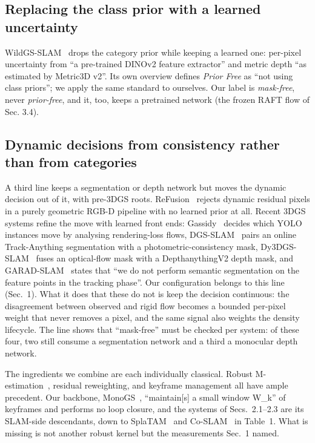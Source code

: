 \subsection{Replacing the class prior with a learned uncertainty}


WildGS-SLAM~\cite{wildgsslam} drops the category prior while keeping a learned one: per-pixel uncertainty from ``a pre-trained DINOv2 feature extractor'' and metric depth ``as estimated by Metric3D v2''. Its own overview defines \emph{Prior Free} as ``not using class priors''; we apply the same standard to ourselves. Our label is \emph{mask-free}, never \emph{prior-free}, and it, too, keeps a pretrained network (the frozen RAFT flow of Sec. 3.4).


\subsection{Dynamic decisions from consistency rather than from categories}


A third line keeps a segmentation or depth network but moves the dynamic decision out of it, with pre-3DGS roots. ReFusion~\cite{bonn} rejects dynamic residual pixels in a purely geometric RGB-D pipeline with no learned prior at all. Recent 3DGS systems refine the move with learned front ends: Gassidy~\cite{gassidy} decides which YOLO instances move by analysing rendering-loss flows, DGS-SLAM~\cite{dgsslamkong} pairs an online Track-Anything segmentation with a photometric-consistency mask, Dy3DGS-SLAM~\cite{dy3dgsslam} fuses an optical-flow mask with a DepthanythingV2 depth mask, and GARAD-SLAM~\cite{garadslam} states that ``we do not perform semantic segmentation on the feature points in the tracking phase''. Our configuration belongs to this line (Sec.~1). What it does that these do not is keep the decision continuous: the disagreement between observed and rigid flow becomes a bounded per-pixel weight that never removes a pixel, and the same signal also weights the density lifecycle. The line shows that ``mask-free'' must be checked per system: of these four, two still consume a segmentation network and a third a monocular depth network.


The ingredients we combine are each individually classical. Robust M-estimation~\cite{huber}, residual reweighting, and keyframe management all have ample precedent. Our backbone, MonoGS~\cite{monogs}, ``maintain[s] a small window W\_k'' of keyframes and performs no loop closure, and the systems of Secs.~2.1--2.3 are its SLAM-side descendants, down to SplaTAM~\cite{splatam} and Co-SLAM~\cite{coslam} in Table~1. What is missing is not another robust kernel but the measurements Sec.~1 named.




